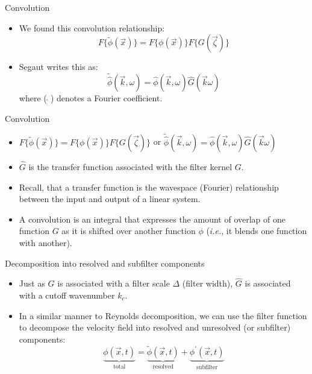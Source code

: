 \begin{frame}{Convolution}

\begin{itemize}
	\item We found this convolution relationship:
	$$\boxed{F\{\tilde \phi(\vec{x})\} = F\{\phi(\vec{x})\}F\{G(\vec{\zeta})\}}$$
	\item Segaut writes this as:
	$$\tilde{\hat \phi}(\vec{k},\omega) = \hat \phi(\vec{k},\omega)\hat G(\vec{k}\omega)$$
	where ($\ \hat{ }\ $) denotes a Fourier coefficient.
\end{itemize}
\end{frame}

\begin{frame}{Convolution}

\begin{itemize}
	\item $F\{\tilde \phi(\vec{x})\} = F\{\phi(\vec{x})\}F\{G(\vec{\zeta})\}$ or $\tilde{\hat \phi}(\vec{k},\omega) = \hat \phi(\vec{k},\omega)\hat G(\vec{k}\omega)$
	\item $\hat G$ is the transfer function associated with the filter kernel $G$.
	\item Recall, that a transfer function is the wavespace (Fourier) relationship between the input and output of a linear system.
	\item A convolution is an integral that expresses the amount of overlap of one function $G$ as it is shifted over another function $\phi$ (\textit{i.e.}, it blends one function with another).
\end{itemize}
\end{frame}

\begin{frame}{Decomposition into resolved and subfilter components}

\begin{itemize}
	\item Just as $G$ is associated with a filter scale $\Delta$ (filter width), $\hat G$ is associated with a cutoff wavenumber  $k_c$.
	\item In a similar manner to Reynolds decomposition, we can use the filter function to decompose the velocity field into resolved and unresolved (or subfilter) components:
	$$\underbrace{\phi(\vec{x},t)}_{\text{total}} = \underbrace{\tilde \phi (\vec{x},t)}_{\text{resolved}} + \underbrace{\phi^{\prime}(\vec{x},t)}_{\text{subfilter}}$$
\end{itemize}
\end{frame}

